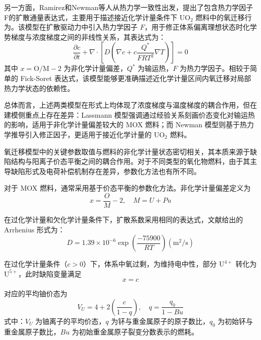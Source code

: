 另一方面，Ramirez和Newman等人\cite{ramirezSimulationsHeatOxygen2006,newmanThreeDimensionalCoupled2009}从热力学一致性出发，提出了包含热力学因子F的扩散通量表达式，主要用于描述接近化学计量条件下 UO$_2$ 燃料中的氧迁移行为。该模型在扩散驱动力中引入热力学因子 $F$，用于修正体系偏离理想状态时化学势梯度与浓度梯度之间的非线性关系，其表达式为：
\begin{equation}
	\frac{\partial c}{\partial t} + \nabla \cdot \left[ D \left( \nabla c + c \frac{Q^*}{F R T^2} \nabla T \right) \right] = 0
\end{equation}
其中 $x=\mathrm{O/M}-2$ 为非化学计量偏差，$Q^*$ 为输运热，$F$ 为热力学因子。相较于简单的 Fick-Soret 表达式，该模型能够更准确描述近化学计量区间内氧迁移对局部热力学状态的依赖性。

总体而言，上述两类模型在形式上均体现了浓度梯度与温度梯度的耦合作用，但在建模侧重点上存在差异：Lassmann 模型强调通过经验关系刻画价态变化对输运热的影响，适用于非化学计量偏差较大的 MOX 燃料；而 Newman 模型则基于热力学推导引入修正因子，更适用于接近化学计量的 UO$_2$ 燃料。


氧迁移模型中的关键参数取值与燃料的非化学计量状态密切相关，其本质来源于缺陷结构与阳离子价态平衡之间的耦合作用。对于不同类型的氧化物燃料，由于其主导缺陷形式及电荷补偿机制存在差异，参数化方法也有所不同。

对于 MOX 燃料，通常采用基于价态平衡的参数化方法。非化学计量偏差定义为
\begin{equation}
	x = \frac{O}{M} - 2, \quad M = U + Pu
\end{equation}

在过化学计量和欠化学计量条件下，扩散系数采用相同的表达式，文献给出的 Arrhenius 形式为：
\begin{equation}
	D = 1.39 \times 10^{-6} \exp{\left( \frac{-75900}{RT} \right)} \left(\text{m}^2/\text{s}\right)
\end{equation}

在过化学计量条件（$c>0$）下，体系中氧过剩，为维持电中性，部分 $\mathrm{U}^{4+}$ 转化为 $\mathrm{U}^{5+}$，此时缺陷变量满足
\begin{equation}
	x = c
\end{equation}

对应的平均铀价态为
\begin{equation}
	V_U = 4 + 2\left( \frac{c}{1 - q} \right), \quad q = \frac{q_0}{1 - Bu}
\end{equation}
式中：$V_U$ 为铀离子的平均价态，$q$ 为钚与重金属原子的原子数比，$q_0$ 为初始钚与重金属原子数比，$Bu$ 为初始重金属原子裂变分数表示的燃耗。

